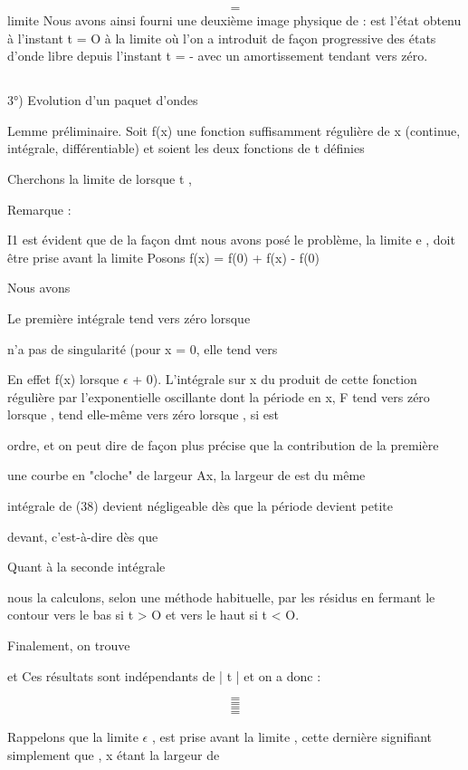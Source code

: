 \[
\tag{36}=
\]
limite
Nous avons ainsi fourni une deuxième image physique de  :
 est l'état obtenu à l'instant t = O à la limite où l'on a introduit
de façon progressive des états d'onde libre  depuis l'instant t = - 
avec un amortissement tendant vers zéro.


\subsection{}%
3°) Evolution d'un paquet d'ondes

Lemme préliminaire.
Soit f(x) une fonction suffisamment régulière de x (continue,
intégrale, différentiable) et soient  les deux fonctions de t définies

Cherchons la limite de  lorsque t ,

Remarque :

I1 est évident que de la façon dmt nous avons posé le problème, la limite
e , doit être prise avant la limite
Posons f(x) = f(0) + f(x) - f(0)

Nous avons

Le première intégrale tend vers zéro lorsque

 n'a pas de singularité (pour x = 0, elle tend vers

En effet
f(x) lorsque $\epsilon$ + 0). L'intégrale sur x du produit de cette fonction régulière
par l'exponentielle oscillante  dont la période en x, F tend vers
zéro lorsque , tend elle-même vers zéro lorsque , si  est

ordre, et on peut dire de façon plus précise que la contribution de la première

une courbe en "cloche" de largeur Ax, la largeur de est du même

 intégrale de (38) devient négligeable dès que la période devient petite

devant, c'est-à-dire dès que 

Quant à la seconde intégrale

nous la calculons, selon une méthode habituelle, par les résidus en fermant
le contour vers le bas si t > O et vers le haut si t < O.


Finalement, on trouve

et
Ces résultats sont indépendants de | t | et on a donc :

\[
\tag{39-a}=
\]
\[
\tag{39-b}=
\]
\[
\tag{39-c}=
\]
\[
\tag{39-d}=
\]

Rappelons que la limite $\epsilon$ , est prise avant la limite  , cette
dernière signifiant simplement que , x étant la largeur de

